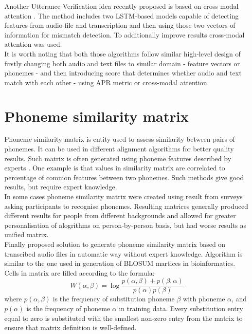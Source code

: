 \documentclass[a4paper,11pt,twoside]{report}
\theoremstyle{definition}
\begin{document}

Another Utterance Verification idea recently proposed is based on cross modal attention \cite{UVAttention}. The method includes two LSTM-based models capable of detecting features from audio file and transcription and then using those two vectors of information for mismatch detection. To additionally improve results cross-modal attention was used. \\

It is worth noting that both those algorithms follow similar high-level design of firstly changing both audio and text files to similar domain - feature vectors or phonemes - and then introducing score that determines whether audio and text match with each other - using APR metric or cross-modal attention.


\section{Phoneme similarity matrix}

Phoneme similarity matrix is entity used to assess similarity between pairs of phonemes. It can be used in different alignment algorithms for better quality results. Such matrix is often generated using phoneme features described by experts \cite{MatrixExpert1, MatrixExpert2}. One example is that values in similarity matrix are correlated to percentage of common features between two phonemes. Such methods give good results, but require expert knowledge. \\
In some cases \cite{MatrixSurvey} phoneme similarity matrix were created using result from surveys asking participants to recognise phonemes. Resulting matrices generally produced different results for people from different backgrounds and allowed for greater personalisation of alogrithms on person-by-person basis, but had worse results as unified matrix.\\
Finally \cite{MatrixBlosum} proposed solution to generate phoneme similarity matrix based on transcibed audio files in automatic way without expert knowledge. Algorithm is similar to the one used in generation of BLOSUM martices in bioinformatics. Cells in matrix are filled according to the formula:
$$ 
W(\alpha, \beta ) = \log \frac{p(\alpha, \beta ) + p(\beta, \alpha )}{p(\alpha )p(\beta )}
$$
where $p(\alpha, \beta )$ is the frequency of substitution phoneme $\beta$ with phoneme $\alpha$, and $p(\alpha)$ is the frequency of phoneme $\alpha$ in training data. Every substitution entry equal to zero is substituted with the smallest non-zero entry from the matrix to ensure that matrix definition is well-defined. 
\end{document}
